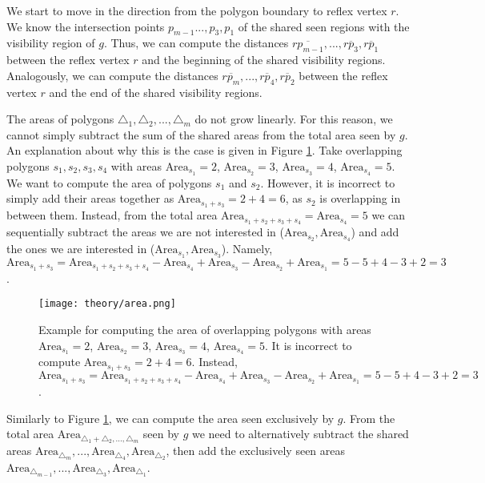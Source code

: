 We start to move in the direction from the polygon boundary to reflex vertex $r$. We know the intersection points $p_{m - 1} ..., p_3, p_1$ of the shared seen regions with the visibility region of $g$. Thus, we can compute the distances $\overline{rp_{m - 1}}, ..., \overline{rp_3}, \overline{rp_1}$ between the reflex vertex $r$ and the beginning of the shared visibility regions. Analogously, we can compute the distances $\overline{rp_m}, ...,  \overline{rp_4}, \overline{rp_2}$ between the reflex vertex $r$ and the end of the shared visibility regions.

The areas of polygons $\triangle_1, \triangle_2, ..., \triangle_m$ do not grow linearly. For this reason, we cannot simply subtract the sum of the shared areas from the total area seen by $g$. An explanation about why this is the case is given in Figure \ref{fig:areas}. Take overlapping polygons $s_1, s_2, s_3, s_4$ with areas $\text{Area}_{s_1} = 2$, $\text{Area}_{s_2} = 3$, $\text{Area}_{s_3} = 4$, $\text{Area}_{s_4} = 5$. We want to compute the area of polygons $s_1$ and $s_2$. However, it is incorrect to simply add their areas together as $\text{Area}_{s_1 + s_3} = 2 + 4 = 6$, as $s_2$ is overlapping in between them. Instead, from the total area $\text{Area}_{s_1 + s_2 + s_3 + s_4} = \text{Area}_{s_4} = 5$ we can sequentially subtract the areas we are not interested in ($\text{Area}_{s_2}, \text{Area}_{s_4}$) and add the ones we are interested in ($\text{Area}_{s_1}, \text{Area}_{s_3}$). Namely, $\text{Area}_{s_1 + s_3} = \text{Area}_{s_1 + s_2 + s_3 + s_4} - \text{Area}_{s_4} + \text{Area}_{s_3} - \text{Area}_{s_2} + \text{Area}_{s_1} = 5 - 5 + 4 - 3 + 2 = 3$.

\begin{figure}[h!]
    \centering
    \texttt{[image: theory/area.png]}
    \caption{Example for computing the area of overlapping polygons with areas $\text{Area}_{s_1} = 2$, $\text{Area}_{s_2} = 3$, $\text{Area}_{s_3} = 4$, $\text{Area}_{s_4} = 5$. It is incorrect to compute $\text{Area}_{s_1 + s_3} = 2 + 4 = 6$. Instead, $\text{Area}_{s_1 + s_3} = \text{Area}_{s_1 + s_2 + s_3 + s_4} - \text{Area}_{s_4} + \text{Area}_{s_3} - \text{Area}_{s_2} + \text{Area}_{s_1} = 5 - 5 + 4 - 3 + 2 = 3$.}
    \label{fig:areas}
\end{figure}

Similarly to Figure \ref{fig:areas}, we can compute the area seen exclusively by $g$. From the total area $\text{Area}_{\triangle_1 + \triangle_2, ..., \triangle_m}$ seen by $g$ we need to alternatively subtract the shared areas $\text{Area}_{\triangle_m}, ..., \text{Area}_{\triangle_4}, \text{Area}_{\triangle_2}$, then add the exclusively seen areas $\text{Area}_{\triangle_{m - 1}}, ..., \text{Area}_{\triangle_3}, \text{Area}_{\triangle_1}$.

